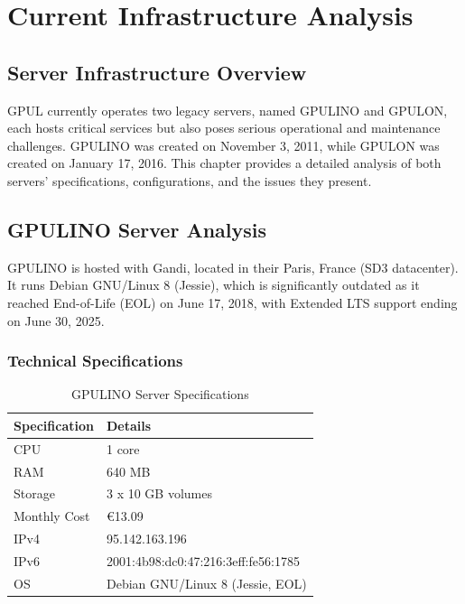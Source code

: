 %

\chapter{Current Infrastructure Analysis}
\label{chap:current_infrastructure}

\section{Server Infrastructure Overview}

GPUL currently operates two legacy servers, named GPULINO and GPULON, each hosts critical services but also poses serious operational and maintenance challenges. GPULINO was created on November 3, 2011, while GPULON was created on January 17, 2016. This chapter provides a detailed analysis of both servers' specifications, configurations, and the issues they present.

\section{GPULINO Server Analysis}

GPULINO is hosted with Gandi, located in their Paris, France (SD3 datacenter). It runs Debian GNU/Linux 8 (Jessie), which is significantly outdated as it reached End-of-Life (EOL) on June 17, 2018, with Extended LTS support ending on June 30, 2025.

\subsection{Technical Specifications}

\begin{table}[H]
  \centering
  \caption{GPULINO Server Specifications}
  \label{tab:gpulino_specs}
  \begin{tabular}{ll}
    \rowcolor{udcpink!25}
    \textbf{Specification} & \textbf{Details} \\
    \hline
    CPU & 1 core \\
    RAM & 640 MB \\
    Storage & 3 x 10 GB volumes \\
    Monthly Cost & €13.09 \\
    IPv4 & 95.142.163.196 \\
    IPv6 & 2001:4b98:dc0:47:216:3eff:fe56:1785 \\
    OS & Debian GNU/Linux 8 (Jessie, EOL) \\
  \end{tabular}
\end{table}

